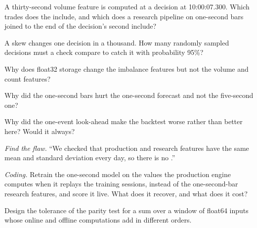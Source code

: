 \begin{exercise}[$\star$]\label{exo:ml:data-and-feature-stores:1}
A thirty-second volume feature is computed at a decision at 10:00:07.300. Which trades does the  include, and which
does a research pipeline on one-second bars joined to the end of the decision's second include?
\end{exercise}

\begin{exercise}[$\star$]\label{exo:ml:data-and-feature-stores:2}
A skew changes one decision in a thousand. How many randomly sampled decisions must a check compare to catch it with
probability 95\%?
\end{exercise}

\begin{exercise}[$\star$]\label{exo:ml:data-and-feature-stores:3}
Why does float32 storage change the imbalance features but not the volume and count features?
\end{exercise}

\begin{exercise}[$\star\star$]\label{exo:ml:data-and-feature-stores:4}
Why did the one-second bars hurt the one-second forecast and not the five-second one?
\end{exercise}

\begin{exercise}[$\star\star$]\label{exo:ml:data-and-feature-stores:5}
Why did the one-event look-ahead make the backtest worse rather than better here? Would it always?
\end{exercise}

\begin{exercise}[$\star\star$]\label{exo:ml:data-and-feature-stores:6}
\emph{Find the flaw.} ``We checked that production and research features have the same mean and standard deviation every day,
so there is no .''
\end{exercise}

\begin{exercise}[$\star\star\star$]\label{exo:ml:data-and-feature-stores:7}
\emph{Coding.} Retrain the one-second model on the values the production engine computes when it replays the training
sessions, instead of the one-second-bar research features, and score it live. What does it recover, and what does it cost?
\end{exercise}

\begin{exercise}[$\star\star\star$]\label{exo:ml:data-and-feature-stores:8}
Design the tolerance of the parity test for a sum over a window of float64 inputs whose online and offline computations add in
different orders.
\end{exercise}

